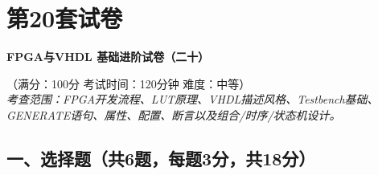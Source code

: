\chapter{第20套试卷}

\begin{center}
\textbf{FPGA与VHDL 基础进阶试卷（二十）}

（满分：100分 \hspace{2em} 考试时间：120分钟 \hspace{2em} 难度：中等）\\[0.3cm]
\textit{考查范围：FPGA开发流程、LUT原理、VHDL描述风格、Testbench基础、GENERATE语句、属性、配置、断言以及组合/时序/状态机设计。}
\end{center}

\section*{一、选择题（共6题，每题3分，共18分）}

